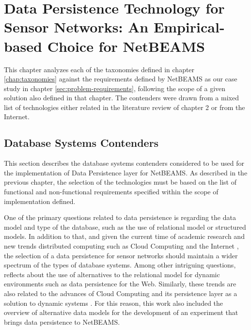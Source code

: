

\chapter{Data Persistence Technology for Sensor Networks: An Empirical-based
Choice for NetBEAMS}

This chapter analyzes each of the taxonomies defined in chapter
\ref{chap:taxonomies} against the requirements defined by NetBEAMS as our case
study in chapter \ref{sec:problem-requirements}, following the scope of a given
solution also defined in that chapter. The contenders were drawn from a mixed
list of technologies either related in the literature review of chapter 2 or
from the Internet.

\section{Database Systems Contenders}

This section describes the database systems contenders considered to be used
for the implementation of Data Persistence layer for NetBEAMS. As described in
the previous chapter, the selection of the technologies must be based on the
list of functional and non-functional requirements specified within the scope
of implementation defined. 

One of the primary questions related to data persistence is regarding the data
model and type of the database, such as the use of relational model or
structured models. In addition to that, and given the current time of academic
research and new trends distributed computing such as Cloud Computing and the
Internet \cite{cloud-comp-survey}, the selection of a data persistence for
sensor networks should maintain a wider spectrum of the types of database
systems. Among other intriguing questions, \cite{db-is-rdbs-dommed} reflects 
about the use of alternatives to the relational model for dynamic
environments such as data persistence for the Web. Similarly, these
trends are also related to the advances of Cloud Computing and its persistence
layer as a solution to dynamic systems \cite{cloud-comp-architectures}. For
this reason, this work also included the overview of alternative data models
for the development of an experiment that brings data persistence to NetBEAMS.

